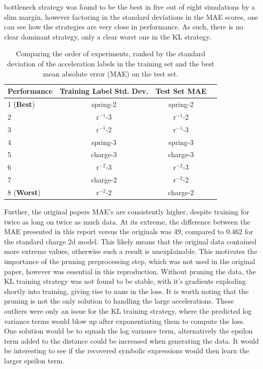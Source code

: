 \documentclass[11pt]{article}
\begin{document}
bottleneck strategy was found to be the best in five out of eight simulations by a slim margin, however factoring in the standard deviations in the MAE scores, one can see how the strategies are very close in performance. As such, there is no clear dominant strategy, only a clear worst one in the KL strategy.
\begin{table}[H]
    \centering
    \begin{tabular}{lccc}
    \toprule
    Performance & Training Label Std. Dev. & Test Set MAE\\
    \midrule
    1 (\textbf{Best}) & spring-2 & spring-2 \\
    2& r$^{-1}$-3 & r$^{-1}$-2  \\
    3& r$^{-1}$-2 & r$^{-1}$-3 \\
    4& spring-3 & spring-3\\
    5& charge-3 & charge-3\\
    6& r$^{-2}$-3 & r$^{-2}$-3\\
    7& charge-2 & r$^{-2}$-2\\
    8 (\textbf{Worst})& r$^{-2}$-2 & charge-2\\
    \bottomrule
    \end{tabular}
    \caption{Comparing the order of experiments, ranked by the standard deviation of the acceleration labels in the training set and the best mean absolute error (MAE) on the test set.}
    \label{tab:std_table_2}
\end{table}
Further, the original papers MAE's are consistently higher, despite training for twice as long on twice as much data. At its extreme, the difference between the MAE presented in this report versus the originals was 49, compared to 0.462 for the standard charge 2d model. This likely means that the original data contained more extreme values, otherwise such a result is unexplainable. This motivates the importance of the pruning preprocessing step, which was not used in the original paper, however was essential in this reproduction. Without pruning the data, the KL training strategy was not found to be stable, with it's gradients exploding shortly into training, giving rise to nans in the loss. It is worth noting that the pruning is not the only solution to handling the large accelerations. These outliers were only an issue for the KL training strategy, where the predicted log variance terms would blow up after exponentiating them to compute the loss. One solution would be to squash the log variance term, alternatively the epsilon term added to the distance could be increased when generating the data. It would be interesting to see if the recovered symbolic expressions would then learn the larger epsilon term.
\end{document}
